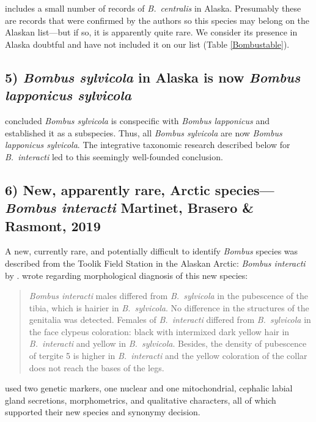 \begin{multicols}{2}
\citet{Williamsetal2014} includes a small number of records of \textit{B.\ centralis} in Alaska. Presumably these are records that were confirmed by the authors so this species may belong on the Alaskan list---but if so, it is apparently quite rare. We consider its presence in Alaska doubtful and have not included it on our list (Table \ref{Bombustable}).

\subsection{5) \textit{Bombus sylvicola} in Alaska is now \textit{Bombus lapponicus sylvicola}}

\citet{Martinetetal2019} concluded \textit{Bombus sylvicola} is conspecific with \textit{Bombus lapponicus} and established it as a subspecies. Thus, all \textit{Bombus sylvicola} are now \textit{Bombus lapponicus sylvicola}. The integrative taxonomic research described below for \textit{B.\ interacti} led to this seemingly well-founded conclusion. 

\subsection{6) New, apparently rare, Arctic species---\textit{Bombus interacti} Martinet, Brasero \& Rasmont, 2019}

A new, currently rare, and potentially difficult to identify \textit{Bombus} species was described from the Toolik Field Station in the Alaskan Arctic: \textit{Bombus interacti} by \citet{Martinetetal2019}. \citet{Martinetetal2019} wrote regarding morphological diagnosis of this new species: 

\begin{quotation}
\textit{Bombus interacti} males differed from \textit{B.\ sylvicola} in the pubescence of the tibia, which is hairier in \textit{B.\ sylvicola}. No difference in the structures of the genitalia was detected. Females of \textit{B.\ interacti} differed from \textit{B.\ sylvicola} in the face clypeus coloration: black with intermixed dark yellow hair in \textit{B.\ interacti} and yellow in \textit{B.\ sylvicola}. Besides, the density of pubescence of tergite 5 is higher in \textit{B.\ interacti} and the yellow coloration of the collar does not reach the bases of the legs.
\end{quotation}



\citet{Martinetetal2019} used two genetic markers, one nuclear and one mitochondrial, cephalic labial gland secretions, morphometrics, and qualitative characters, all of which supported their new species and synonymy decision. 


\end{multicols}
